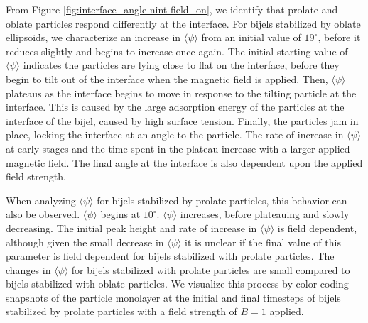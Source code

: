 From Figure \ref{fig:interface_angle-nint-field_on}, we identify that prolate and oblate particles respond differently at the interface. For
bijels stabilized by oblate ellipsoids, we characterize an increase in $\langle \psi \rangle$ from an initial value of $19 ^{\circ}$,
before it reduces slightly and begins to increase once again. The initial starting value of $\langle \psi \rangle$ indicates the
particles are lying close to flat on the interface, before they begin to tilt out of the interface when the magnetic field is applied. Then,
$\langle \psi \rangle$ plateaus as the interface begins to move in response to the tilting particle at the interface. This is caused by the
large adsorption energy of the particles at the interface of the bijel, caused by high surface tension. Finally, the particles jam in place,
locking the interface at an angle to the particle. The rate of increase in $\langle \psi \rangle$ at early stages and the time spent
in the plateau increase with a larger applied magnetic field. The final angle at the interface is also dependent upon the applied field
strength.

When analyzing $\langle \psi \rangle$ for bijels stabilized by prolate particles, this behavior can also be observed. $\langle \psi \rangle$
begins at $10 ^{\circ}$. $\langle \psi \rangle$ increases, before plateauing and slowly decreasing. The initial peak height and rate of increase in 
$\langle \psi \rangle$ is field dependent, although given the small decrease in $\langle \psi \rangle$ it is unclear if the final value of this parameter 
is field dependent for bijels stabilized with prolate particles. The changes in $\langle \psi \rangle$ for bijels stabilized with prolate particles are 
small compared to bijels stabilized with oblate particles. We visualize this process by color coding snapshots of the particle monolayer at the initial
and final timesteps of bijels stabilized by prolate particles with a field strength of $\bar{B} = 1$ applied.


